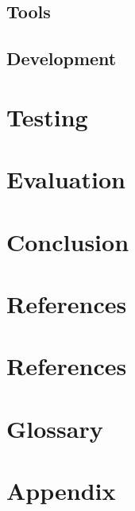 \documentclass{article}
\begin{document}
  \subsection{Tools}
  \subsection{Development}

  \newpage
  \section{Testing}

  \newpage
  \section{Evaluation}

  \newpage
  \section{Conclusion}

  \newpage
  \section{References}

  \newpage
  \section{References}

  \newpage
  \section{Glossary}

  \newpage
  \section{Appendix}
\end{document}
